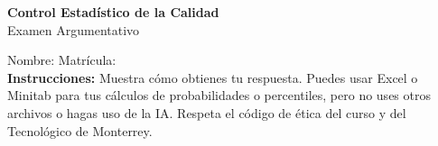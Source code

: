 \documentclass[11pt]{article}
\newcommand{\exinput}[1]{}
\begin{document}
\begin{center}
\large \textbf{Control Estad\'istico de la Calidad} \\
\large Examen Argumentativo
\end{center}

Nombre: \underline{\hspace*{3in}} \quad Matr\'icula:\underline{\hspace*{2in}} \\

\noindent \textbf{Instrucciones:} Muestra c\'omo obtienes tu respuesta. Puedes usar Excel 
o Minitab para tus cálculos de probabilidades o 
percentiles, pero no uses otros archivos o hagas uso de la IA. Respeta el 
c\'odigo de \'etica del curso y del Tecnol\'ogico 
de Monterrey.

\begin{enumerate}
    \exinput{exercises}
\end{enumerate}
\end{document}
